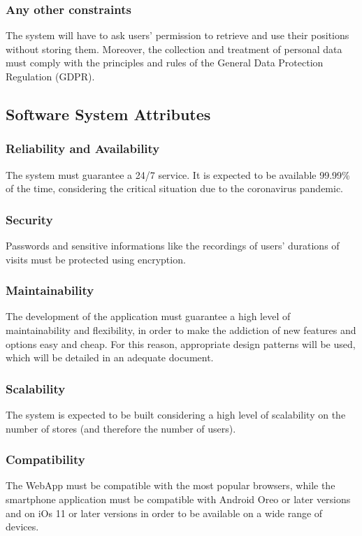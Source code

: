 \documentclass{article}
\begin{document}
\subsubsection{Any other constraints}
The system will have to ask users' permission to retrieve and use their positions without storing them. Moreover, the collection and treatment of personal data must comply with the principles and rules of the General Data Protection Regulation (GDPR).

\subsection{Software System Attributes}
\subsubsection{Reliability and Availability}
The system must guarantee a 24/7 service. It is expected to be available 99.99\% of the time, considering the critical situation due to the coronavirus pandemic.
\subsubsection{Security}
Passwords and sensitive informations like the recordings of users' durations of visits must be protected using encryption.
\subsubsection{Maintainability}
The development of the application must guarantee a high level of maintainability and flexibility, in order to make the addiction of new features and options easy and cheap. For this reason, appropriate design patterns will be used, which will be detailed in an adequate document.
\subsubsection{Scalability}
The system is expected to be built considering a high level of scalability on the number of stores (and therefore the number of users).
\subsubsection{Compatibility}
The WebApp must be compatible with the most popular browsers, while the smartphone application must be compatible with Android Oreo or later versions and on iOs 11 or later versions in order to be available on a wide range of devices.
\end{document}
